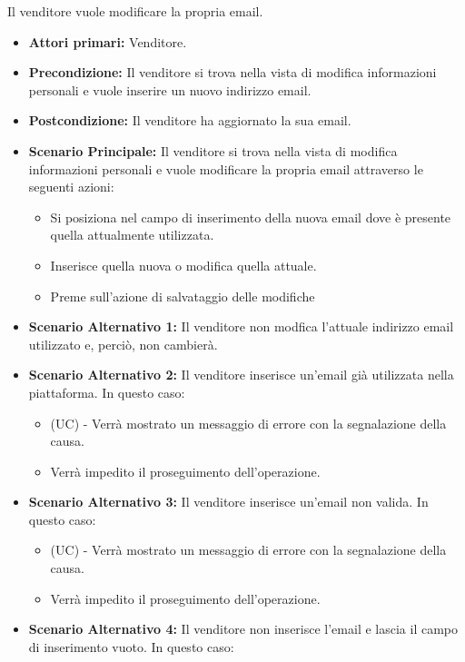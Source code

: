 Il venditore vuole modificare la propria email.
\begin{itemize}
    \item \textbf{Attori primari:} Venditore.
    \item \textbf{Precondizione:} Il venditore si trova nella vista di modifica informazioni personali e vuole inserire un nuovo indirizzo email.
    \item \textbf{Postcondizione:} Il venditore ha aggiornato la sua email.
    \item \textbf{Scenario Principale:} Il venditore si trova nella vista di modifica informazioni personali e vuole modificare la propria email attraverso le seguenti azioni:
    \begin{itemize}
        \item Si posiziona nel campo di inserimento della nuova email dove è presente quella attualmente utilizzata.
        \item Inserisce quella nuova o modifica quella attuale.
        \item Preme sull'azione di salvataggio delle modifiche
    \end{itemize}
    \item \textbf{Scenario Alternativo 1:} Il venditore non modfica l'attuale indirizzo email utilizzato e, perciò, non cambierà.
    \item \textbf{Scenario Alternativo 2:} Il venditore inserisce un'email già utilizzata nella piattaforma. In questo caso:
    \begin{itemize}
        \item (UC) - Verrà mostrato un messaggio di errore con la segnalazione della causa.
        \item Verrà impedito il proseguimento dell'operazione.
    \end{itemize}
    \item \textbf{Scenario Alternativo 3:} Il venditore inserisce un'email non valida. In questo caso:
    \begin{itemize}
        \item (UC) - Verrà mostrato un messaggio di errore con la segnalazione della causa.
        \item Verrà impedito il proseguimento dell'operazione.
    \end{itemize}
    \item \textbf{Scenario Alternativo 4:} Il venditore non inserisce l'email e lascia il campo di inserimento vuoto. In questo caso:
    \begin{itemize}

\end{itemize}
\end{itemize}

